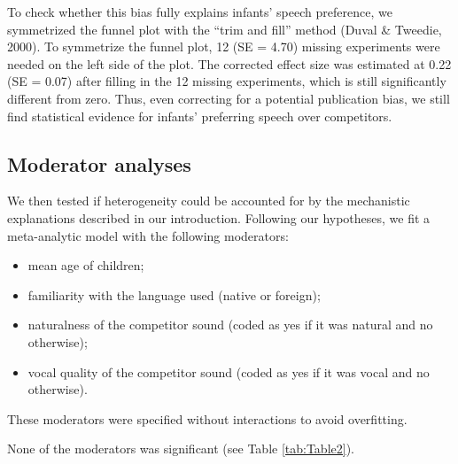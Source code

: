 \documentclass[
  man]{apa6}
\providecommand{\tightlist}{%
  \setlength{\itemsep}{0pt}\setlength{\parskip}{0pt}}
\begin{document}
To check whether this bias fully explains infants' speech preference, we symmetrized the funnel plot with the \enquote{trim and fill} method (Duval \& Tweedie, 2000). To symmetrize the funnel plot, 12 (SE = 4.70) missing experiments were needed on the left side of the plot. The corrected effect size was estimated at 0.22 (SE = 0.07) after filling in the 12 missing experiments, which is still significantly different from zero. Thus, even correcting for a potential publication bias, we still find statistical evidence for infants' preferring speech over competitors.

\hypertarget{moderator-analyses}{%
\subsection{Moderator analyses}\label{moderator-analyses}}

We then tested if heterogeneity could be accounted for by the mechanistic explanations described in our introduction. Following our hypotheses, we fit a meta-analytic model with the following moderators:

\begin{itemize}
\tightlist
\item
  mean age of children;
\item
  familiarity with the language used (native or foreign);
\item
  naturalness of the competitor sound (coded as yes if it was natural and no otherwise);
\item
  vocal quality of the competitor sound (coded as yes if it was vocal and no otherwise).
\end{itemize}

These moderators were specified without interactions to avoid overfitting.

None of the moderators was significant (see Table \ref{tab:Table2}).
\end{document}
